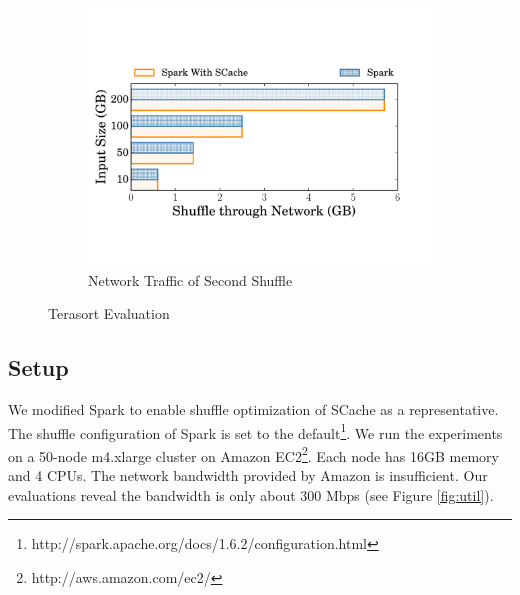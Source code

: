 \begin{figure}
\begin{minipage}[t]{.32\linewidth}
\begin{subfigure}{\linewidth}
			\begin{minipage}{\linewidth}
				\includegraphics[width=\linewidth]{fig/tera_shuffle}
				\caption{Network Traffic of Second Shuffle}
				\label{fig:terashuffle}
			\end{minipage}
		\end{subfigure}
		\caption{Terasort Evaluation}
	\end{minipage}
\end{figure}

\subsection{Setup}\label{stepup}
We modified Spark to enable shuffle optimization of SCache as a representative.
The shuffle configuration of Spark is set to the default\footnote{http://spark.apache.org/docs/1.6.2/configuration.html}. 
We run the experiments on a 50-node m4.xlarge cluster on Amazon EC2\footnote{http://aws.amazon.com/ec2/}. 
Each node has 16GB memory and 4 CPUs. The network bandwidth provided by Amazon is insufficient. 
Our evaluations reveal the bandwidth is only about 300 Mbps (see Figure \ref{fig:util}).

